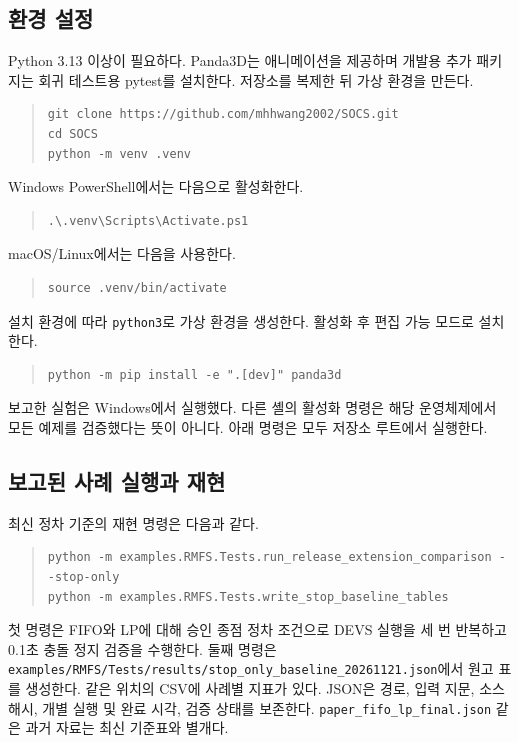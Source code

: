\documentclass[11pt,a4paper]{article}
\theoremstyle{remark}
\begin{document}
\subsection{환경 설정}
Python 3.13 이상이 필요하다. Panda3D는 애니메이션을 제공하며 개발용 추가 패키지는 회귀 테스트용 pytest를 설치한다. 저장소를 복제한 뒤 가상 환경을 만든다.
\begin{quote}\small
\begin{verbatim}
git clone https://github.com/mhhwang2002/SOCS.git
cd SOCS
python -m venv .venv
\end{verbatim}
\end{quote}
Windows PowerShell에서는 다음으로 활성화한다.
\begin{quote}\small
\begin{verbatim}
.\.venv\Scripts\Activate.ps1
\end{verbatim}
\end{quote}
macOS/Linux에서는 다음을 사용한다.
\begin{quote}\small
\begin{verbatim}
source .venv/bin/activate
\end{verbatim}
\end{quote}
설치 환경에 따라 \nolinkurl{python3}로 가상 환경을 생성한다. 활성화 후 편집 가능 모드로 설치한다.
\begin{quote}\small
\begin{verbatim}
python -m pip install -e ".[dev]" panda3d
\end{verbatim}
\end{quote}
보고한 실험은 Windows에서 실행했다. 다른 셸의 활성화 명령은 해당 운영체제에서 모든 예제를 검증했다는 뜻이 아니다. 아래 명령은 모두 저장소 루트에서 실행한다.

\subsection{보고된 사례 실행과 재현}
최신 정차 기준의 재현 명령은 다음과 같다.
\begin{quote}\small\begin{verbatim}
python -m examples.RMFS.Tests.run_release_extension_comparison --stop-only
python -m examples.RMFS.Tests.write_stop_baseline_tables
\end{verbatim}\end{quote}
첫 명령은 FIFO와 LP에 대해 승인 종점 정차 조건으로 DEVS 실행을 세 번 반복하고 0.1초 충돌 정지 검증을 수행한다. 둘째 명령은 \nolinkurl{examples/RMFS/Tests/results/stop_only_baseline_20261121.json}에서 원고 표를 생성한다. 같은 위치의 CSV에 사례별 지표가 있다. JSON은 경로, 입력 지문, 소스 해시, 개별 실행 및 완료 시각, 검증 상태를 보존한다. \nolinkurl{paper_fifo_lp_final.json} 같은 과거 자료는 최신 기준표와 별개다.
\end{document}
